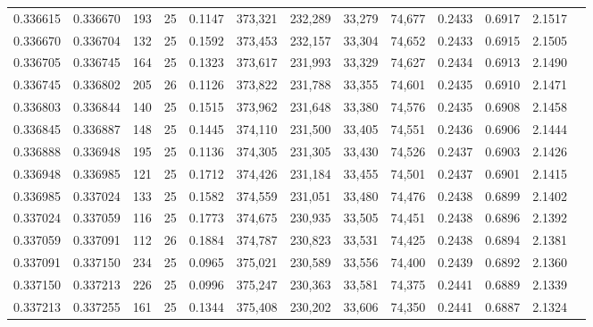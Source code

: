 \begin{tabular}{rrrrrrrrrrrrr}
0.336615 & 0.336670 &   193 &  25 &                                     0.1147 & 373,321 & 232,289 &  33,279 &  74,677 & 0.2433 & 0.6917 & 2.1517 \\
0.336670 & 0.336704 &   132 &  25 &                                     0.1592 & 373,453 & 232,157 &  33,304 &  74,652 & 0.2433 & 0.6915 & 2.1505 \\
0.336705 & 0.336745 &   164 &  25 &                                     0.1323 & 373,617 & 231,993 &  33,329 &  74,627 & 0.2434 & 0.6913 & 2.1490 \\
0.336745 & 0.336802 &   205 &  26 &                                     0.1126 & 373,822 & 231,788 &  33,355 &  74,601 & 0.2435 & 0.6910 & 2.1471 \\
0.336803 & 0.336844 &   140 &  25 &                                     0.1515 & 373,962 & 231,648 &  33,380 &  74,576 & 0.2435 & 0.6908 & 2.1458 \\
0.336845 & 0.336887 &   148 &  25 &                                     0.1445 & 374,110 & 231,500 &  33,405 &  74,551 & 0.2436 & 0.6906 & 2.1444 \\
0.336888 & 0.336948 &   195 &  25 &                                     0.1136 & 374,305 & 231,305 &  33,430 &  74,526 & 0.2437 & 0.6903 & 2.1426 \\
0.336948 & 0.336985 &   121 &  25 &                                     0.1712 & 374,426 & 231,184 &  33,455 &  74,501 & 0.2437 & 0.6901 & 2.1415 \\
0.336985 & 0.337024 &   133 &  25 &                                     0.1582 & 374,559 & 231,051 &  33,480 &  74,476 & 0.2438 & 0.6899 & 2.1402 \\
0.337024 & 0.337059 &   116 &  25 &                                     0.1773 & 374,675 & 230,935 &  33,505 &  74,451 & 0.2438 & 0.6896 & 2.1392 \\
0.337059 & 0.337091 &   112 &  26 &                                     0.1884 & 374,787 & 230,823 &  33,531 &  74,425 & 0.2438 & 0.6894 & 2.1381 \\
0.337091 & 0.337150 &   234 &  25 &                                     0.0965 & 375,021 & 230,589 &  33,556 &  74,400 & 0.2439 & 0.6892 & 2.1360 \\
0.337150 & 0.337213 &   226 &  25 &                                     0.0996 & 375,247 & 230,363 &  33,581 &  74,375 & 0.2441 & 0.6889 & 2.1339 \\
0.337213 & 0.337255 &   161 &  25 &                                     0.1344 & 375,408 & 230,202 &  33,606 &  74,350 & 0.2441 & 0.6887 & 2.1324 \\

\end{tabular}
